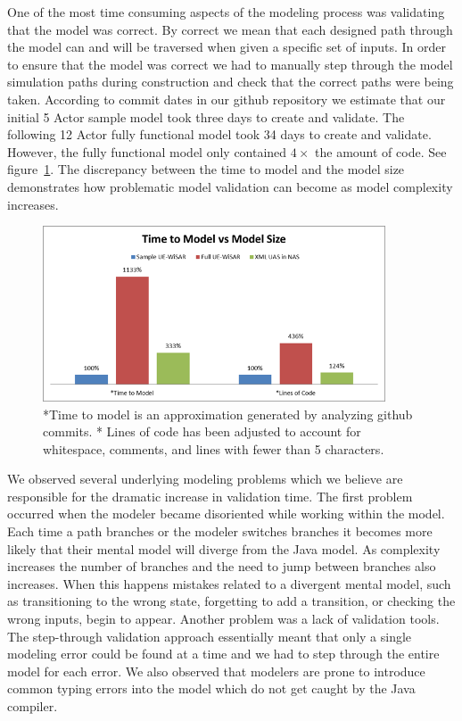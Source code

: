 One of the most time consuming aspects of the modeling process was validating that the model was correct.  By correct we mean that each designed path through the model can and will be traversed when given a specific set of inputs.  In order to ensure that the model was correct we had to manually step through the model simulation paths during construction and check that the correct paths were being taken.  According to commit dates in our github repository we estimate that our initial 5 Actor sample model took three days to create and validate.  The following 12 Actor fully functional model took 34 days to create and validate.  However, the fully functional model only contained $4\times$ the amount of code.  See figure~\ref{fig:time_to_model}.  The discrepancy between the time to model and the model size demonstrates how problematic model validation can become as model complexity increases.

\begin{figure}[h]
\begin{center}
\includegraphics[width=4in]{time_to_model.png}
\caption{*Time to model is an approximation generated by analyzing github commits.  * Lines of code has been adjusted to account for whitespace, comments, and lines with fewer than 5 characters. }
\label{fig:time_to_model}
\end{center}
\end{figure}

We observed several underlying modeling problems which we believe are responsible for the dramatic increase in validation time.  The first problem occurred when the modeler became disoriented while working within the model.  Each time a path branches or the modeler switches branches it becomes more likely that their mental model will diverge from the Java model.  As complexity increases the number of branches and the need to jump between branches also increases.  When this happens mistakes related to a divergent mental model, such as transitioning to the wrong state, forgetting to add a transition, or checking the wrong inputs, begin to appear.  Another problem was a lack of validation tools.  The step-through validation approach essentially meant that only a single modeling error could be found at a time and we had to step through the entire model for each error.  We also observed that modelers are prone to introduce common typing errors into the model which do not get caught by the Java compiler.  

